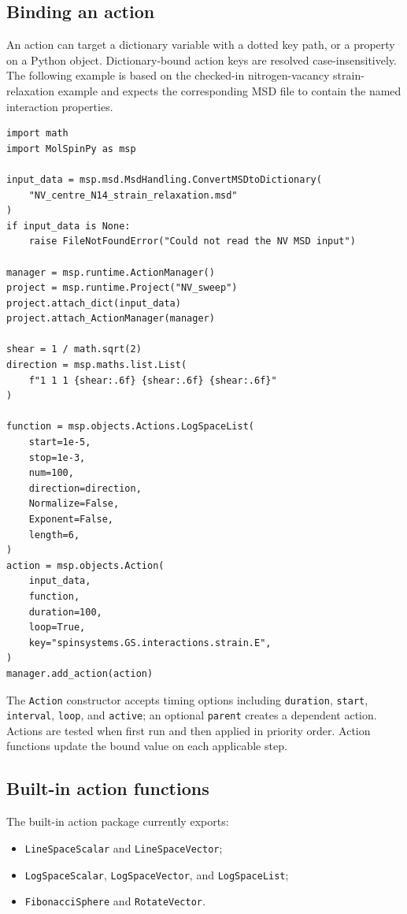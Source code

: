 \documentclass[11pt,a4paper]{article}
\begin{document}
\subsection{Binding an action}

An action can target a dictionary variable with a dotted key path, or a
property on a Python object. Dictionary-bound action keys are resolved
case-insensitively. The following example is based on the checked-in
nitrogen-vacancy strain-relaxation example and expects the corresponding MSD
file to contain the named interaction properties.

\begin{lstlisting}
import math
import MolSpinPy as msp

input_data = msp.msd.MsdHandling.ConvertMSDtoDictionary(
    "NV_centre_N14_strain_relaxation.msd"
)
if input_data is None:
    raise FileNotFoundError("Could not read the NV MSD input")

manager = msp.runtime.ActionManager()
project = msp.runtime.Project("NV_sweep")
project.attach_dict(input_data)
project.attach_ActionManager(manager)

shear = 1 / math.sqrt(2)
direction = msp.maths.list.List(
    f"1 1 1 {shear:.6f} {shear:.6f} {shear:.6f}"
)

function = msp.objects.Actions.LogSpaceList(
    start=1e-5,
    stop=1e-3,
    num=100,
    direction=direction,
    Normalize=False,
    Exponent=False,
    length=6,
)
action = msp.objects.Action(
    input_data,
    function,
    duration=100,
    loop=True,
    key="spinsystems.GS.interactions.strain.E",
)
manager.add_action(action)
\end{lstlisting}

The \texttt{Action} constructor accepts timing options including
\texttt{duration}, \texttt{start}, \texttt{interval}, \texttt{loop}, and
\texttt{active}; an optional \texttt{parent} creates a dependent action.
Actions are tested when first run and then applied in priority order. Action
functions update the bound value on each applicable step.

\subsection{Built-in action functions}

The built-in action package currently exports:
\begin{itemize}[nosep]
  \item \texttt{LineSpaceScalar} and \texttt{LineSpaceVector};
  \item \texttt{LogSpaceScalar}, \texttt{LogSpaceVector}, and
        \texttt{LogSpaceList};
  \item \texttt{FibonacciSphere} and \texttt{RotateVector}.
\end{itemize}
\end{document}
